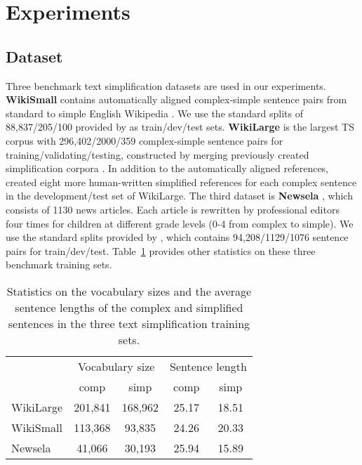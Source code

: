 \documentclass[11pt,a4paper]{article}
\begin{document}
\section{Experiments}
\label{sec:experiments}
\subsection{Dataset}
\label{sec:dataset}
Three benchmark text simplification datasets are used in our experiments. \textbf{WikiSmall} contains automatically aligned complex-simple sentence pairs from standard to simple English Wikipedia \citep{zhu2010monolingual}. We use the standard splits of 88,837/205/100 provided by \citet{zhang2017sentence} as train/dev/test sets. \textbf{WikiLarge} \citep{zhang2017sentence} is the largest TS corpus with 296,402/2000/359 complex-simple sentence pairs for training/validating/testing, constructed by merging previously created simplification corpora \cite{zhu2010monolingual,woodsend2011learning,kauchak2013improving}. In addition to the automatically aligned references, \citet{xu2016optimizing} created eight more human-written simplified references for each complex sentence in the development/test set of WikiLarge. The third dataset is \textbf{Newsela} \citep{xu2015problems}, which consists of 1130 news articles. Each article is rewritten by professional editors four times for children at different grade levels (0-4 from complex to simple). We use the standard splits provided by \citet{zhang2017sentence}, which contains 94,208/1129/1076 sentence pairs for train/dev/test. Table~\ref{table:dataset_stats} provides other statistics on these three benchmark training sets.
\begin{table}[h]
\small
\centering
\begin{tabular}{l|cc|cc}
\toprule
  & \multicolumn{2}{c|}{Vocabulary size} & \multicolumn{2}{c}{Sentence length} \\
 & comp & simp & comp & simp \\ \midrule
WikiLarge & 201,841 & 168,962 & 25.17 & 18.51 \\
WikiSmall & 113,368 & 93,835 & 24.26 & 20.33 \\
Newsela & 41,066 & 30,193 & 25.94 & 15.89 \\ \bottomrule
\end{tabular}
\caption{Statistics on the vocabulary sizes and the average sentence lengths of the complex and simplified sentences in the three text simplification training sets.}
\label{table:dataset_stats}
\end{table}
\end{document}

